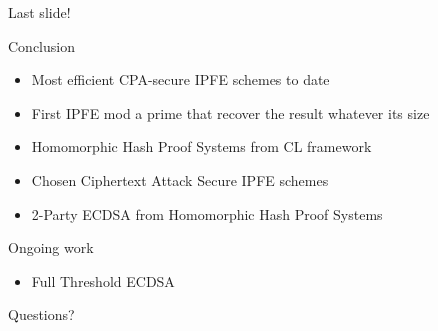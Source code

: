 \documentclass[10pt]{beamer}
\begin{document}
\begin{frame}{Last slide!}
\begin{block}{Conclusion}
\begin{itemize}
\item Most efficient CPA-secure IPFE schemes to date
\item First IPFE mod a prime that recover the result whatever its size
\item Homomorphic Hash Proof Systems from CL framework
\item Chosen Ciphertext Attack Secure IPFE schemes 
\item 2-Party ECDSA from Homomorphic Hash Proof Systems
\end{itemize}
\end{block}
\begin{block}{Ongoing work}
\begin{itemize}
\item Full Threshold ECDSA
\end{itemize}
\end{block}
\end{frame}

\begin{frame}[standout]
  Questions?
\end{frame}


\begin{frame}
%
%


\end{frame}
\end{document}
